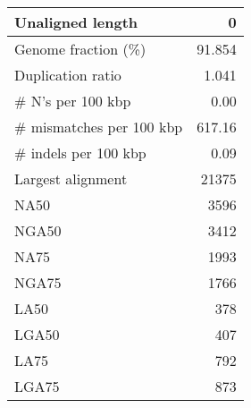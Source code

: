 \documentclass[12pt,a4paper]{article}
\begin{document}
\begin{table}[ht]
\begin{center}
\begin{tabular}{|l*{1}{|r}|}
Unaligned length & 0 \\ \hline
Genome fraction (\%) & 91.854 \\ \hline
Duplication ratio & 1.041 \\ \hline
\# N's per 100 kbp & 0.00 \\ \hline
\# mismatches per 100 kbp & 617.16 \\ \hline
\# indels per 100 kbp & 0.09 \\ \hline
Largest alignment & 21375 \\ \hline
NA50 & 3596 \\ \hline
NGA50 & 3412 \\ \hline
NA75 & 1993 \\ \hline
NGA75 & 1766 \\ \hline
LA50 & 378 \\ \hline
LGA50 & 407 \\ \hline
LA75 & 792 \\ \hline
LGA75 & 873 \\ \hline
\end{tabular}
\end{center}
\end{table}
\end{document}
